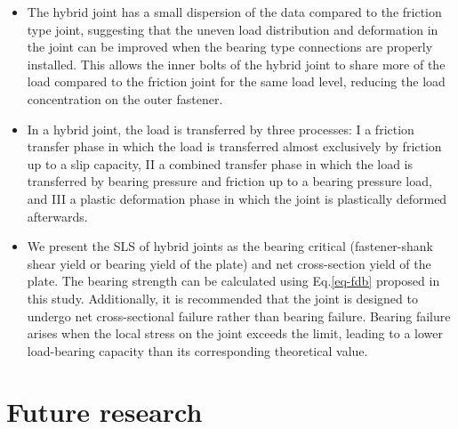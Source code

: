 \begin{itemize}

\item The hybrid joint has a small dispersion of the data compared to the friction type joint, suggesting that the uneven load distribution and deformation in the joint can be improved when the bearing type connections are properly installed. This allows the inner bolts of the hybrid joint to share more of the load compared to the friction joint for the same load level, reducing the load concentration on the outer fastener.

\item In a hybrid joint, the load is transferred by three processes: \RN{1} a friction transfer phase in which the load is transferred almost exclusively by friction up to a slip capacity, \RN{2} a combined transfer phase in which the load is transferred by bearing pressure and friction up to a bearing pressure load, and \RN{3} a plastic deformation phase in which the joint is plastically deformed afterwards. 

\item We present the SLS of hybrid joints as the bearing critical (fastener-shank shear yield or bearing yield of the plate) and net cross-section yield of the plate. The bearing strength can be calculated using Eq.\ref{eq-fdb} proposed in this study. Additionally, it is recommended that the joint is designed to undergo net cross-sectional failure rather than bearing failure. Bearing failure arises when the local stress on the joint exceeds the limit, leading to a lower load-bearing capacity than its corresponding theoretical value.

\end{itemize}



\section{Future research}

